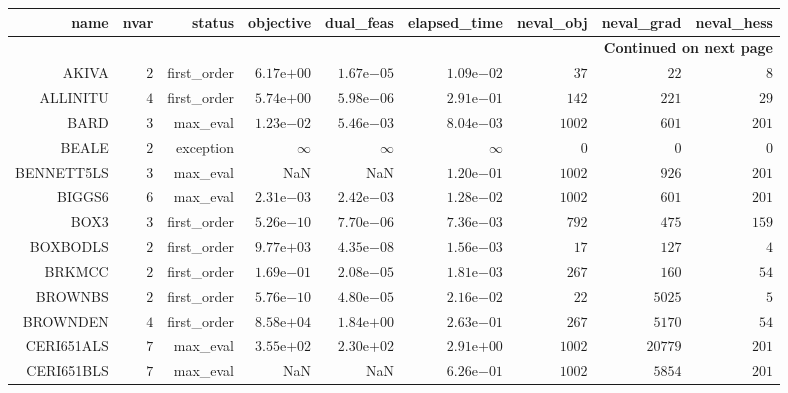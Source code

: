 \begin{longtable}{rrrrrrrrr}
\hline
name & nvar & status & objective & dual\_feas & elapsed\_time & neval\_obj & neval\_grad & neval\_hess \\\hline
\endhead
\hline
\multicolumn{9}{r}{{\bfseries Continued on next page}}\\
\hline
\endfoot
\endlastfoot
AKIVA & \(     2\) & first\_order & \( 6.17\)e\(+00\) & \( 1.67\)e\(-05\) & \( 1.09\)e\(-02\) & \(    37\) & \(    22\) & \(     8\) \\
ALLINITU & \(     4\) & first\_order & \( 5.74\)e\(+00\) & \( 5.98\)e\(-06\) & \( 2.91\)e\(-01\) & \(   142\) & \(   221\) & \(    29\) \\
BARD & \(     3\) & max\_eval & \( 1.23\)e\(-02\) & \( 5.46\)e\(-03\) & \( 8.04\)e\(-03\) & \(  1002\) & \(   601\) & \(   201\) \\
BEALE & \(     2\) & exception & \(\infty\) & \(\infty\) & \(\infty\) & \(     0\) & \(     0\) & \(     0\) \\
BENNETT5LS & \(     3\) & max\_eval &       NaN &       NaN & \( 1.20\)e\(-01\) & \(  1002\) & \(   926\) & \(   201\) \\
BIGGS6 & \(     6\) & max\_eval & \( 2.31\)e\(-03\) & \( 2.42\)e\(-03\) & \( 1.28\)e\(-02\) & \(  1002\) & \(   601\) & \(   201\) \\
BOX3 & \(     3\) & first\_order & \( 5.26\)e\(-10\) & \( 7.70\)e\(-06\) & \( 7.36\)e\(-03\) & \(   792\) & \(   475\) & \(   159\) \\
BOXBODLS & \(     2\) & first\_order & \( 9.77\)e\(+03\) & \( 4.35\)e\(-08\) & \( 1.56\)e\(-03\) & \(    17\) & \(   127\) & \(     4\) \\
BRKMCC & \(     2\) & first\_order & \( 1.69\)e\(-01\) & \( 2.08\)e\(-05\) & \( 1.81\)e\(-03\) & \(   267\) & \(   160\) & \(    54\) \\
BROWNBS & \(     2\) & first\_order & \( 5.76\)e\(-10\) & \( 4.80\)e\(-05\) & \( 2.16\)e\(-02\) & \(    22\) & \(  5025\) & \(     5\) \\
BROWNDEN & \(     4\) & first\_order & \( 8.58\)e\(+04\) & \( 1.84\)e\(+00\) & \( 2.63\)e\(-01\) & \(   267\) & \(  5170\) & \(    54\) \\
CERI651ALS & \(     7\) & max\_eval & \( 3.55\)e\(+02\) & \( 2.30\)e\(+02\) & \( 2.91\)e\(+00\) & \(  1002\) & \( 20779\) & \(   201\) \\
CERI651BLS & \(     7\) & max\_eval &       NaN &       NaN & \( 6.26\)e\(-01\) & \(  1002\) & \(  5854\) & \(   201\) \\

\end{longtable}
